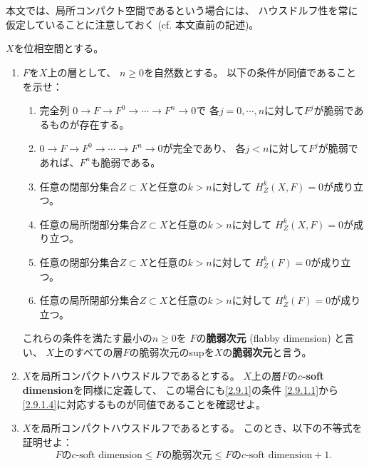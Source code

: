 \documentclass[uplatex,dvipdfmx]{jsarticle}
\begin{document}
\maketitle
\HeaderCommentA
\section{}

本文では、局所コンパクト空間であるという場合には、
ハウスドルフ性を常に仮定していることに注意しておく
(cf. 本文\cite[Proposition 2.5.1]{kashiwara2002sheaves}直前の記述)。
\fi

\begin{prob}\label{2.9}
  \(X\)を位相空間とする。
  \begin{enumerate}
    \item \label{2.9.1}
    \(F\)を\(X\)上の層として、
    \(n \geq 0\)を自然数とする。
    以下の条件が同値であることを示せ：
    \begin{enumerate}
      \item \label{2.9.1.1}
      完全列
      \(0\to F\to F^0\to \cdots \to F^n\to 0\)で
      各\(j=0,\cdots,n\)に対して\(F^j\)が脆弱であるものが存在する。
      \item \label{2.9.1.2}
      \(0\to F\to F^0\to \cdots \to F^n\to 0\)が完全であり、
      各\(j<n\)に対して\(F^j\)が脆弱であれば、\(F^n\)も脆弱である。
      \item \label{2.9.1.3}
      任意の閉部分集合\(Z\subset X\)と任意の\(k>n\)に対して
      \(H^k_Z(X,F) = 0\)が成り立つ。
      \item \label{2.9.1.4}
      任意の局所閉部分集合\(Z\subset X\)と任意の\(k>n\)に対して
      \(H^k_Z(X,F) = 0\)が成り立つ。
      \item \label{2.9.1.5}
      任意の閉部分集合\(Z\subset X\)と任意の\(k>n\)に対して
      \(H^k_Z(F) = 0\)が成り立つ。
      \item \label{2.9.1.6}
      任意の局所閉部分集合\(Z\subset X\)と任意の\(k>n\)に対して
      \(H^k_Z(F) = 0\)が成り立つ。
    \end{enumerate}
    これらの条件を満たす最小の\(n\geq 0\)を
    \(F\)の\textbf{脆弱次元} (flabby dimension) と言い、
    \(X\)上のすべての層\(F\)の脆弱次元のsupを\(X\)の\textbf{脆弱次元}と言う。
    \item \label{2.9.2}
    \(X\)を局所コンパクトハウスドルフであるとする。
    \(X\)上の層\(F\)の\textbf{\(c\)-soft dimension}を同様に定義して、
    この場合にも\ref{2.9.1}の条件
    \ref{2.9.1.1}から\ref{2.9.1.4}に対応するものが同値であることを確認せよ。
    \item \label{2.9.3}
    \(X\)を局所コンパクトハウスドルフであるとする。
    このとき、以下の不等式を証明せよ：
    \[
    \text{\(F\)の\(c\)-soft dimension} \leq \text{\(F\)の脆弱次元}
    \leq \text{\(F\)の\(c\)-soft dimension} + 1.
    \]
  \end{enumerate}
\end{prob}
\end{document}
